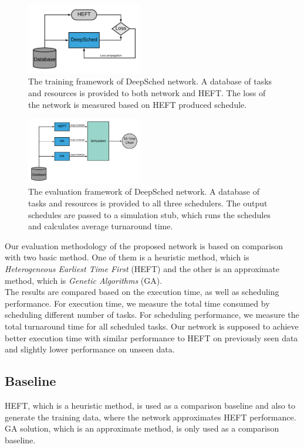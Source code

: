 \begin{figure}[hp]
    \centering
    \includegraphics[width=0.45\textwidth]{diagrams/train_framework}
    \caption{The training framework of DeepSched network. A database of tasks and resources is provided to both network and HEFT. The loss of the network is measured based on HEFT produced schedule.}
    \label{fig:fw}
\end{figure}

\begin{figure}[hp]
    \centering
    \includegraphics[width=0.45\textwidth]{diagrams/eval_framework}
    \caption{The evaluation framework of DeepSched network. A database of tasks and resources is provided to all three schedulers. The output schedules are passed to a simulation stub, which runs the schedules and calculates average turnaround time.}
    \label{fig:efw}
\end{figure}

Our evaluation methodology of the proposed network is based on comparison with two basic method. One of them is a heuristic method, which is \emph{Heterogeneous Earliest Time First} (HEFT) and the other is an approximate method, which is \emph{Genetic Algorithms} (GA). \\

The results are compared based on the execution time, as well as scheduling performance. For execution time, we measure the total time consumed by scheduling different number of tasks. For scheduling performance, we measure the total turnaround time for all scheduled tasks. Our network is supposed to achieve better execution time with similar performance to HEFT on previously seen data and slightly lower performance on unseen data. 

\subsection{Baseline}
HEFT, which is a heuristic method, is used as a comparison baseline and also to generate the training data, where the network approximates HEFT performance. GA solution, which is an approximate method, is only used as a comparison baseline. \\

